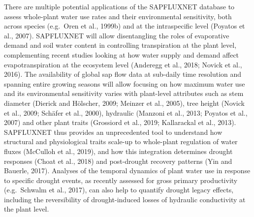 \documentclass[11pt,twoside]{reedthesis}
\begin{document}
There are multiple potential applications of the SAPFLUXNET database to
assess whole-plant water use rates and their environmental sensitivity,
both across species (e.g.~Oren et al., 1999b) and at the intraspecific
level (Poyatos et al., 2007). SAPFLUXNET will allow disentangling the
roles of evaporative demand and soil water content in controlling
transpiration at the plant level, complementing recent studies looking
at how water supply and demand affect evapotranspiration at the
ecosystem level (Anderegg et al., 2018; Novick et al., 2016). The
availability of global sap flow data at sub-daily time resolution and
spanning entire growing seasons will allow focusing on how maximum water
use and its environmental sensitivity varies with plant-level attributes
such as stem diameter (Dierick and Hölscher, 2009; Meinzer et al.,
2005), tree height (Novick et al., 2009; Schäfer et al., 2000),
hydraulic (Manzoni et al., 2013; Poyatos et al., 2007) and other plant
traits (Grossiord et al., 2019; Kallarackal et al., 2013). SAPFLUXNET
thus provides an unprecedented tool to understand how structural and
physiological traits scale-up to whole-plant regulation of water fluxes
(McCulloh et al., 2019), and how this integration determines drought
responses (Choat et al., 2018) and post-drought recovery patterns (Yin
and Bauerle, 2017). Analyses of the temporal dynamics of plant water use
in response to specific drought events, as recently assessed for gross
primary productivity (e.g.~Schwalm et al., 2017), can also help to
quantify drought legacy effects, including the reversibility of
drought-induced losses of hydraulic conductivity at the plant level.\par
\end{document}
